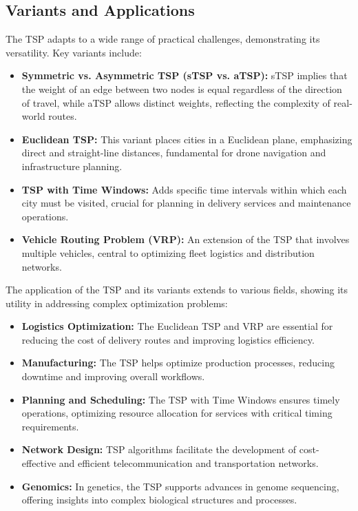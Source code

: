 \subsection{Variants and Applications}

The \Gls{TSP} adapts to a wide range of practical challenges, demonstrating its versatility. Key variants include:

\begin{itemize}
	\item \textbf{Symmetric vs. Asymmetric TSP (sTSP vs. aTSP):} sTSP implies that the weight of an edge between two nodes is equal regardless of the direction of travel, while aTSP allows distinct weights, reflecting the complexity of real-world routes.
	\item \textbf{Euclidean TSP:} This variant places cities in a Euclidean plane, emphasizing direct and straight-line distances, fundamental for drone navigation and infrastructure planning.
	\item \textbf{TSP with Time Windows:} Adds specific time intervals within which each city must be visited, crucial for planning in delivery services and maintenance operations.
	\item \textbf{Vehicle Routing Problem (VRP):} An extension of the \Gls{TSP} that involves multiple vehicles, central to optimizing fleet logistics and distribution networks.
\end{itemize}

The application of the \Gls{TSP} and its variants extends to various fields, showing its utility in addressing complex optimization problems:

\begin{itemize}
	\item \textbf{Logistics Optimization:} The Euclidean \Gls{TSP} and VRP are essential for reducing the cost of delivery routes and improving logistics efficiency.
	\item \textbf{Manufacturing:} The \Gls{TSP} helps optimize production processes, reducing downtime and improving overall workflows.
	\item \textbf{Planning and Scheduling:} The \Gls{TSP} with Time Windows ensures timely operations, optimizing resource allocation for services with critical timing requirements.
	\item \textbf{Network Design:} \Gls{TSP} algorithms facilitate the development of cost-effective and efficient telecommunication and transportation networks.
	\item \textbf{Genomics:} In genetics, the \Gls{TSP} supports advances in genome sequencing, offering insights into complex biological structures and processes.
\end{itemize}

